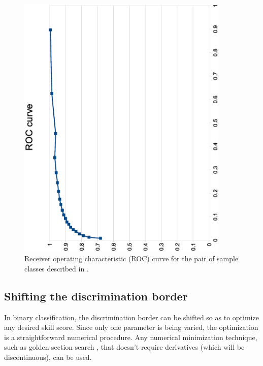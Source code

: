 \documentclass{article}
\begin{document}
\begin{figure}
\includegraphics[width=0.9\textwidth,angle=-90]{sample_roc.eps}
Receiver operating characteristic (ROC) curve
for the pair of sample classes described in \citet{Mills2011}.
\label{sample_roc}
\end{figure}

\subsection{Shifting the discrimination border}

In binary classification, the discrimination border can be shifted so as to
optimize any desired skill score.  Since only one parameter is being varied,
the optimization is a straightforward numerical procedure.  Any numerical
minimization technique, such as golden section search \citep{Press_etal1992},
that doesn't require derivatives (which will be discontinuous), can be used.
\end{document}
